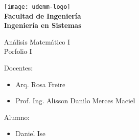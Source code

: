 \begin{titlepage}
	\begin{center}
		\vspace*{0.5cm}
		\texttt{[image: udemm-logo]}\\
		\vspace{0.2cm}
		\Large
		\textbf{Facultad de Ingeniería}\\
		\textbf{Ingeniería en Sistemas}\\
		\vspace{2cm}

		\Huge
		Análisis Matemático I\\
		Porfolio I
		\vfill

		\raggedright
		\Large
		Docentes:
		\begin{itemize}
			\item[] Arq. Rosa Freire\\
			\item[] Prof. Ing. Alisson Danilo Merces Maciel\\
		\end{itemize}
		Alumno: 
		\begin{itemize}
			\item[] Daniel Ise
		\end{itemize}
		\vspace{1cm}

	\end{center}
\end{titlepage}
